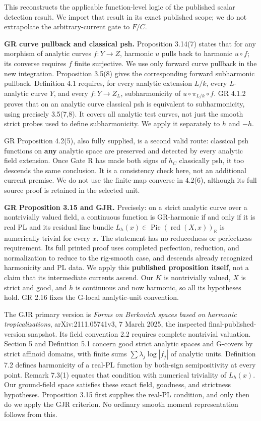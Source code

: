 \documentclass[
  11pt,
]{article}
\begin{document}
This reconstructs the applicable function-level logic of the published
scalar detection result. We import that result in its exact published
scope; we do not extrapolate the arbitrary-current gate to \(F/C\).

\textbf{GR curve pullback and classical psh.} Proposition 3.14(7) states
that for any morphism of analytic curves \(f:Y\to Z\), harmonic \(u\)
pulls back to harmonic \(u\circ f\); its converse requires \(f\) finite
surjective. We use only forward curve pullback in the new integration.
Proposition 3.5(8) gives the corresponding forward subharmonic pullback.
Definition 4.1 requires, for every analytic extension \(L/k\), every
\(L\)-analytic curve \(Y\), and every \(f:Y\to Z_L\), subharmonicity of
\(u\circ\pi_{L/k}\circ f\). GR 4.1.2 proves that on an analytic curve
classical psh is equivalent to subharmonicity, using precisely 3.5(7,8).
It covers all analytic test curves, not just the smooth strict probes
used to define subharmonicity. We apply it separately to \(h\) and
\(-h\).

GR Proposition 4.2(5), also fully supplied, is a second valid route:
classical psh functions on \textbf{any} analytic space are preserved and
detected by every analytic field extension. Once Gate R has made both
signs of \(h_C\) classically psh, it too descends the same conclusion.
It is a consistency check here, not an additional current premise. We do
not use the finite-map converse in 4.2(6), although its full source
proof is retained in the selected unit.

\textbf{GR Proposition 3.15 and GJR.} Precisely: on a strict analytic
curve over a nontrivially valued field, a continuous function is
GR-harmonic if and only if it is real PL and its residual line bundle
\(L_h(x)\in\operatorname{Pic}(\operatorname{red}(X,x))_{\mathbb R}\) is
numerically trivial for every \(x\). The statement has no reducedness or
perfectness requirement. Its full printed proof uses completed
perfection, reduction, and normalization to reduce to the rig-smooth
case, and descends already recognized harmonicity and PL data. We apply
this \textbf{published proposition itself}, not a claim that its
intermediate currents ascend. Our \(K\) is nontrivially valued, \(X\) is
strict and good, and \(h\) is continuous and now harmonic, so all its
hypotheses hold. GR 2.16 fixes the G-local analytic-unit convention.

The GJR primary version is \emph{Forms on Berkovich spaces based on
harmonic tropicalizations}, arXiv:2111.05741v3, 7 March 2025, the
inspected final-published-version snapshot. Its field convention 2.2
requires complete nontrivial valuation. Section 5 and Definition 5.1
concern good strict analytic spaces and G-covers by strict affinoid
domains, with finite sums \(\sum\lambda_j\log|f_j|\) of analytic units.
Definition 7.2 defines harmonicity of a real-PL function by both-sign
semipositivity at every point. Remark 7.3(1) equates that condition with
numerical triviality of \(L_h(x)\). Our ground-field space satisfies
these exact field, goodness, and strictness hypotheses. Proposition 3.15
first supplies the real-PL condition, and only then do we apply the GJR
criterion. No ordinary smooth moment representation follows from this.
\end{document}
